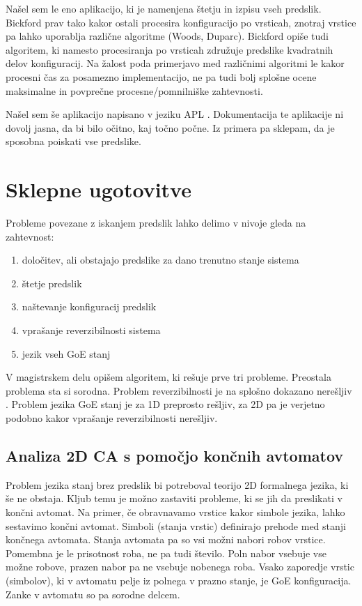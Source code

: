 \documentclass[12pt,a4paper,openany,twoside]{book}
\begin{document}
Našel sem le eno aplikacijo, ki je namenjena štetju in izpisu vseh predslik.
Bickford \cite{Bickford2012} prav tako kakor ostali procesira konfiguracijo
po vrsticah, znotraj vrstice pa lahko uporablja različne algoritme (Woods, Duparc).
Bickford opiše tudi algoritem, ki namesto procesiranja po vrsticah združuje predslike
kvadratnih delov konfiguracij. Na žalost poda primerjavo med različnimi algoritmi
le kakor procesni čas za posamezno implementacijo, ne pa tudi bolj splošne
ocene maksimalne in povprečne procesne/pomnilniške zahtevnosti.

Našel sem še aplikacijo napisano v jeziku APL \cite{ionreq2013}.
Dokumentacija te aplikacije ni dovolj jasna, da bi bilo očitno, kaj točno počne.
Iz primera pa sklepam, da je sposobna poiskati vse predslike.

\chapter{Sklepne ugotovitve}

Probleme povezane z iskanjem predslik lahko delimo v nivoje gleda na zahtevnost:
\begin{enumerate}
\item določitev, ali obstajajo predslike za dano trenutno stanje sistema
\item štetje predslik
\item naštevanje konfiguracij predslik
\item vprašanje reverzibilnosti sistema
\item jezik vseh GoE stanj
\end{enumerate}

V magistrskem delu opišem algoritem, ki rešuje prve tri probleme.
Preostala problema sta si sorodna.
Problem reverzibilnosti je na splošno dokazano nerešljiv \cite{Kari1989}.
Problem jezika GoE stanj je za 1D preprosto rešljiv, za 2D pa je
verjetno podobno kakor vprašanje reverzibilnosti nerešljiv.

\section{Analiza 2D CA s pomočjo končnih avtomatov}

Problem jezika stanj brez predslik bi potreboval teorijo 2D formalnega jezika, ki še ne obstaja.
Kljub temu je možno zastaviti probleme, ki se jih da preslikati v končni avtomat.
Na primer, če obravnavamo vrstice kakor simbole jezika, lahko sestavimo končni avtomat.
Simboli (stanja vrstic) definirajo prehode med stanji končnega avtomata. Stanja avtomata pa
so vsi možni nabori robov vrstice. Pomembna je le prisotnost roba, ne pa tudi število.
Poln nabor vsebuje vse možne robove, prazen nabor pa ne vsebuje nobenega roba.
Vsako zaporedje vrstic (simbolov), ki v avtomatu pelje iz polnega v prazno stanje, je GoE konfiguracija.
Zanke v avtomatu so pa sorodne delcem.
\end{document}
